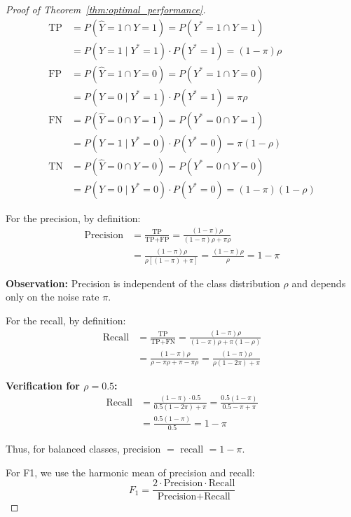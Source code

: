 \documentclass{article} %
\theoremstyle{plain}
\theoremstyle{definition}
\theoremstyle{remark}
\begin{document}
\begin{proof}[Proof of Theorem~\ref{thm:optimal_performance}]
\begin{align}
\text{TP} &= P(\hat{Y} = 1 \cap Y = 1) = P(Y^* = 1 \cap Y = 1) \nonumber \\
&= P(Y = 1 \mid Y^* = 1) \cdot P(Y^* = 1) = (1-\pi)\rho \\
\text{FP} &= P(\hat{Y} = 1 \cap Y = 0) = P(Y^* = 1 \cap Y = 0) \nonumber \\
&= P(Y = 0 \mid Y^* = 1) \cdot P(Y^* = 1) = \pi\rho \\
\text{FN} &= P(\hat{Y} = 0 \cap Y = 1) = P(Y^* = 0 \cap Y = 1) \nonumber \\
&= P(Y = 1 \mid Y^* = 0) \cdot P(Y^* = 0) = \pi(1-\rho) \\
\text{TN} &= P(\hat{Y} = 0 \cap Y = 0) = P(Y^* = 0 \cap Y = 0) \nonumber \\
&= P(Y = 0 \mid Y^* = 0) \cdot P(Y^* = 0) = (1-\pi)(1-\rho)
\end{align}

For the precision, by definition:
\begin{align}
\text{Precision} &= \frac{\text{TP}}{\text{TP} + \text{FP}} = \frac{(1-\pi)\rho}{(1-\pi)\rho + \pi\rho} \nonumber \\
&= \frac{(1-\pi)\rho}{\rho[(1-\pi) + \pi]} = \frac{(1-\pi)\rho}{\rho} = 1 - \pi
\end{align}

\textbf{Observation:} Precision is independent of the class distribution $\rho$ and depends only on the noise rate $\pi$.

For the recall, by definition:
\begin{align}
\text{Recall} &= \frac{\text{TP}}{\text{TP} + \text{FN}} = \frac{(1-\pi)\rho}{(1-\pi)\rho + \pi(1-\rho)} \nonumber \\
&= \frac{(1-\pi)\rho}{\rho - \pi\rho + \pi - \pi\rho} = \frac{(1-\pi)\rho}{\rho(1-2\pi) + \pi}
\end{align}

\textbf{Verification for $\rho = 0.5$:}
\begin{equation}
\begin{aligned}
\text{Recall}
&= \frac{(1-\pi) \cdot 0.5}{0.5(1-2\pi) + \pi}
 = \frac{0.5(1-\pi)}{0.5 - \pi + \pi} \\
&= \frac{0.5(1-\pi)}{0.5} = 1 - \pi
\end{aligned}
\end{equation}

Thus, for balanced classes, precision $=$ recall $= 1-\pi$.

For F1, we use the harmonic mean of precision and recall:
\begin{equation}
F_1 = \frac{2 \cdot \text{Precision} \cdot \text{Recall}}{\text{Precision} + \text{Recall}}
\end{equation}


\end{proof}
\end{document}
